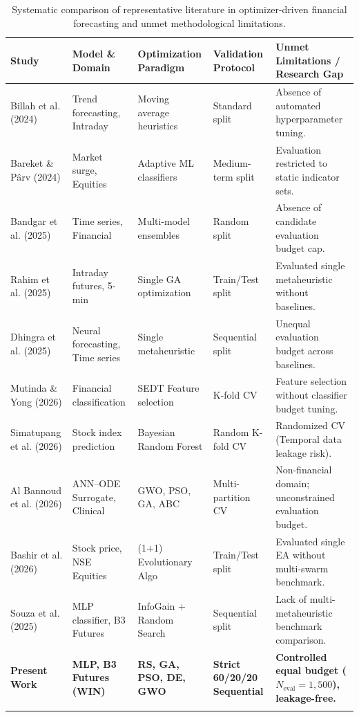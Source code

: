 
\begin{table}[htbp]
\caption{Systematic comparison of representative literature in optimizer-driven financial forecasting and unmet methodological limitations.}
\label{tab:literature_gap}
\centering
\small
\setlength{\tabcolsep}{4pt}
\begin{tabularx}{\textwidth}{@{}L L L L L@{}}
\toprule
Study & Model \& Domain & Optimization Paradigm & Validation Protocol & Unmet Limitations / Research Gap \\
\midrule
Billah et al. (2024) \cite{billah2024nca_moving_average} & Trend forecasting, Intraday & Moving average heuristics & Standard split & Absence of automated hyperparameter tuning. \\
Bareket \& P{\^a}rv (2024) \cite{bareket2024adaptive} & Market surge, Equities & Adaptive ML classifiers & Medium-term split & Evaluation restricted to static indicator sets. \\
Bandgar et al. (2025) \cite{bandgar2025finchronos} & Time series, Financial & Multi-model ensembles & Random split & Absence of candidate evaluation budget cap. \\
Rahim et al. (2025) \cite{rahim2025technical} & Intraday futures, 5-min & Single GA optimization & Train/Test split & Evaluated single metaheuristic without baselines. \\
Dhingra et al. (2025) \cite{dhingra2025solar} & Neural forecasting, Time series & Single metaheuristic & Sequential split & Unequal evaluation budget across baselines. \\
Mutinda \& Yong (2026) \cite{mutinda2026hybrid} & Financial classification & SEDT Feature selection & K-fold CV & Feature selection without classifier budget tuning. \\
Simatupang et al. (2026) \cite{simatupang2026stock} & Stock index prediction & Bayesian Random Forest & Random K-fold CV & Randomized CV (Temporal data leakage risk). \\
Al Bannoud et al. (2026) \cite{al_bannoud2026accelerating} & ANN--ODE Surrogate, Clinical & GWO, PSO, GA, ABC & Multi-partition CV & Non-financial domain; unconstrained evaluation budget. \\
Bashir et al. (2026) \cite{bashir2026evobagnet} & Stock price, NSE Equities & (1+1) Evolutionary Algo & Train/Test split & Evaluated single EA without multi-swarm benchmark. \\
Souza et al. (2025) \cite{souza2025iccsa} & MLP classifier, B3 Futures & InfoGain + Random Search & Sequential split & Lack of multi-metaheuristic benchmark comparison. \\
\textbf{Present Work} & \textbf{MLP, B3 Futures (WIN)} & \textbf{RS, GA, PSO, DE, GWO} & \textbf{Strict 60/20/20 Sequential} & \textbf{Controlled equal budget ($N_{\text{eval}}=1,500$), leakage-free.} \\
\botrule
\end{tabularx}
\end{table}
